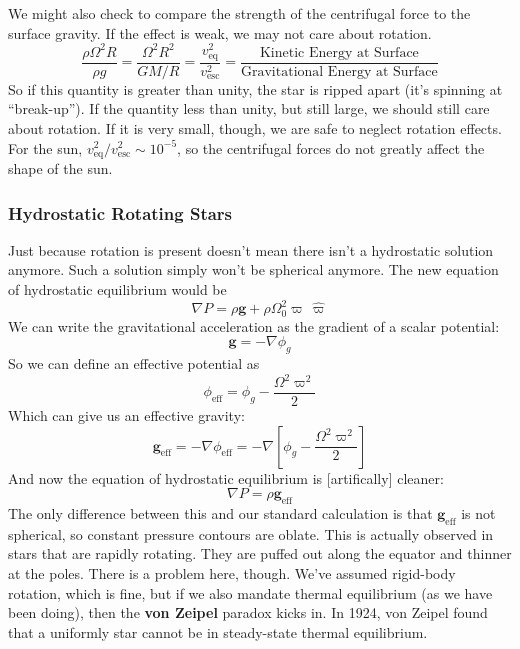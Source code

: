 \documentclass[10pt]{article}
\numberwithin{equation}{section}
\newcommand{\n}{\noindent}
\begin{document}
  \n We might also check to compare the strength of the centrifugal force to the
  surface gravity. If the effect is weak, we may not care about rotation.
  \begin{equation}
    \label{eq:dr:4} \frac{\rho \Omega^2 R}{\rho g} = \frac{\Omega^2 R^2}{GM/R}
    = \frac{v_{\mathrm{eq}}^2}{v_{\mathrm{esc}}^2} = \frac{\textrm{Kinetic
    Energy at Surface}}{\textrm{Gravitational Energy at Surface}}
  \end{equation}
  So if this quantity is greater than unity, the star is ripped apart (it's
  spinning at ``break-up''). If the quantity less than unity, but still large,
  we should still care about rotation. If it is very small, though, we are safe
  to neglect rotation effects. For the sun,
  $v_{\mathrm{eq}}^2/v_{\mathrm{esc}}^2 \sim 10^{-5}$, so the centrifugal
  forces do not greatly affect the shape of the sun.
  
  \subsubsection{Hydrostatic Rotating Stars} %
  \label{ssub:hydrostatic_rotating_stars}
  Just because rotation is present doesn't mean there isn't a hydrostatic
  solution anymore. Such a solution simply won't be spherical anymore. The new
  equation of hydrostatic equilibrium would be
  \begin{equation}
    \label{eq:dr:5} \nabla P = \rho\mathbf{g} +
    \rho\Omega_0^2\varpi\,\hat{\varpi}
  \end{equation}
  We can write the gravitational acceleration as the gradient of a scalar
  potential:
  \begin{equation}
    \label{dr:6} \mathbf{g} = -\nabla \phi_g
  \end{equation}
  So we can define an effective potential as
  \begin{equation}
    \label{dr:7} \phi_{\mathrm{eff}} = \phi_g - \frac{\Omega^2\varpi^2}{2}
  \end{equation}
  Which can give us an effective gravity:
  \begin{equation}
    \label{dr:8} \mathbf{g}_{\mathrm{eff}} = -\nabla \phi_{\mathrm{eff}} =
    -\nabla \left[\phi_g - \frac{\Omega^2\varpi^2}{2}\right]
  \end{equation}
  And now the equation of hydrostatic equilibrium is [artifically] cleaner:
  \begin{equation}
    \label{eq:dr:9} \nabla P = \rho \mathbf{g}_{\mathrm{eff}}
  \end{equation}
  The only difference between this and our standard calculation is that
  $\mathbf{g}_{\mathrm{eff}}$ is not spherical, so constant pressure contours
  are oblate. This is actually observed in stars that are rapidly rotating.
  They are puffed out along the equator and thinner at the poles. There is a
  problem here, though. We've assumed rigid-body rotation, which is fine, but
  if we also mandate thermal equilibrium (as we have been doing), then the
  \textbf{von Zeipel} paradox kicks in. In 1924, von Zeipel found that a
  uniformly star cannot be in steady-state thermal equilibrium.\\
  
\end{document}
